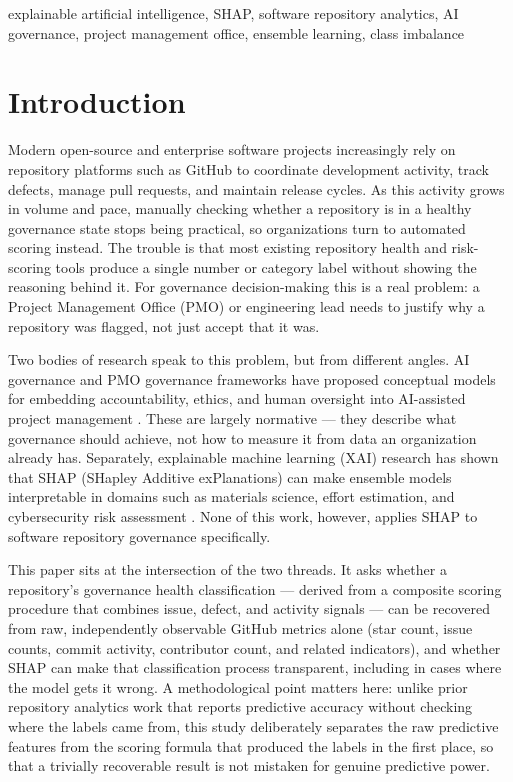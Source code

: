 \documentclass[conference]{IEEEtran}
\begin{document}
\begin{IEEEkeywords}
explainable artificial intelligence, SHAP, software repository analytics, AI governance, project management office, ensemble learning, class imbalance
\end{IEEEkeywords}

\section{Introduction}

Modern open-source and enterprise software projects increasingly rely on repository
platforms such as GitHub to coordinate development activity, track defects, manage
pull requests, and maintain release cycles. As this activity grows in volume and pace,
manually checking whether a repository is in a healthy governance state stops being
practical, so organizations turn to automated scoring instead. The trouble is that most
existing repository health and risk-scoring tools produce a single number or category
label without showing the reasoning behind it. For governance decision-making this is a
real problem: a Project Management Office (PMO) or engineering lead needs to justify why
a repository was flagged, not just accept that it was.

Two bodies of research speak to this problem, but from different angles. AI governance
and PMO governance frameworks have proposed conceptual models for embedding
accountability, ethics, and human oversight into AI-assisted project management
\cite{ref1,ref2,ref3,ref4,ref5,ref6,ref7,ref8,ref9}. These are largely normative --- they
describe what governance should achieve, not how to measure it from data an organization
already has. Separately, explainable machine learning (XAI) research has shown that SHAP
(SHapley Additive exPlanations) can make ensemble models interpretable in domains such as
materials science, effort estimation, and cybersecurity risk assessment
\cite{ref10,ref11,ref12,ref13}. None of this work, however, applies SHAP to software
repository governance specifically.

This paper sits at the intersection of the two threads. It asks whether a repository's
governance health classification --- derived from a composite scoring procedure that
combines issue, defect, and activity signals --- can be recovered from raw,
independently observable GitHub metrics alone (star count, issue counts, commit
activity, contributor count, and related indicators), and whether SHAP can make that
classification process transparent, including in cases where the model gets it wrong.
A methodological point matters here: unlike prior repository analytics work that reports
predictive accuracy without checking where the labels came from, this study deliberately
separates the raw predictive features from the scoring formula that produced the labels
in the first place, so that a trivially recoverable result is not mistaken for genuine
predictive power.
\end{document}
